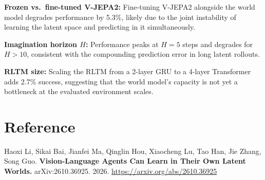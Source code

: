 \documentclass[10pt,twocolumn]{article}
\begin{document}
\textbf{Frozen vs.\ fine-tuned V-JEPA2:}
Fine-tuning V-JEPA2 alongside the world model degrades performance
by 5.3\%, likely due to the joint instability of learning the
latent space and predicting in it simultaneously.

\textbf{Imagination horizon $H$:}
Performance peaks at $H = 5$ steps and degrades for $H > 10$,
consistent with the compounding prediction error in long latent
rollouts.

\textbf{RLTM size:}
Scaling the RLTM from a 2-layer GRU to a 4-layer Transformer adds
2.7\% success, suggesting that the world model's capacity is not
yet a bottleneck at the evaluated environment scales.

\section*{Reference}

Haoxi Li, Sikai Bai, Jianfei Ma, Qinglin Hou, Xiaocheng Lu,
Tao Han, Jie Zhang, Song Guo.
\textbf{Vision-Language Agents Can Learn in Their Own Latent Worlds.}
arXiv:2610.36925. 2026.
\url{https://arxiv.org/abs/2610.36925}
\end{document}
